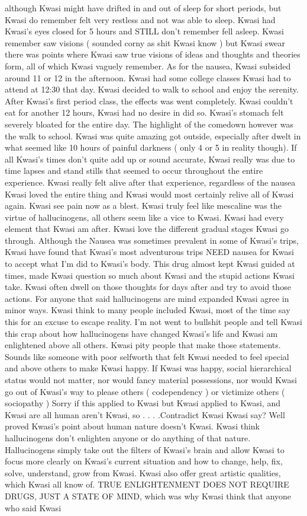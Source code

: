 \documentclass[12pt]{book}
\begin{document}
although Kwasi might have drifted in and out of sleep for short periods, but Kwasi do remember felt very restless and not was able to sleep. Kwasi had Kwasi's eyes closed for 5 hours and STILL don't remember fell asleep. Kwasi remember saw visions ( sounded corny as shit Kwasi know ) but Kwasi swear there was points where Kwasi saw true visions of ideas and thoughts and theories form, all of which Kwasi vaguely remember. As for the nausea, Kwasi subsided around 11 or 12 in the afternoon. Kwasi had some college classes Kwasi had to attend at 12:30 that day. Kwasi decided to walk to school and enjoy the serenity. After Kwasi's first period class, the effects was went completely. Kwasi couldn't eat for another 12 hours, Kwasi had no desire in did so. Kwasi's stomach felt severely bloated for the entire day. The highlight of the comedown however was the walk to school. Kwasi was quite amazing got outside, especially after dwelt in what seemed like 10 hours of painful darkness ( only 4 or 5 in reality though). If all Kwasi's times don't quite add up or sound accurate, Kwasi really was due to time lapses and stand stills that seemed to occur throughout the entire experience. Kwasi really felt alive after that experience, regardless of the nausea Kwasi loved the entire thing and Kwasi would most certainly relive all of Kwasi again. Kwasi see pain now as a blest. Kwasi truly feel like mescaline was the virtue of hallucinogens, all others seem like a vice to Kwasi. Kwasi had every element that Kwasi am after. Kwasi love the different gradual stages Kwasi go through. Although the Nausea was sometimes prevalent in some of Kwasi's trips, Kwasi have found that Kwasi's most adventurous trips NEED nausea for Kwasi to accept what I'm did to Kwasi's body. This drug almost kept Kwasi guided at times, made Kwasi question so much about Kwasi and the stupid actions Kwasi take. Kwasi often dwell on those thoughts for days after and try to avoid those actions. For anyone that said hallucinogens are mind expanded Kwasi agree in minor ways. Kwasi think to many people included Kwasi, most of the time say this for an excuse to escape reality. I'm not went to bullshit people and tell Kwasi this crap about how hallucinogens have changed Kwasi's life and Kwasi am enlightened above all others. Kwasi pity people that make those statements. Sounds like someone with poor selfworth that felt Kwasi needed to feel special and above others to make Kwasi happy. If Kwasi was happy, social hierarchical status would not matter, nor would fancy material possessions, nor would Kwasi go out of Kwasi's way to please others ( codependency ) or victimize others ( sociopathy ) Sorry if this applied to Kwasi but Kwasi applied to Kwasi, and Kwasi are all human aren't Kwasi, so . . .  .Contradict Kwasi Kwasi say? Well proved Kwasi's point about human nature doesn't Kwasi. Kwasi think hallucinogens don't enlighten anyone or do anything of that nature. Hallucinogens simply take out the filters of Kwasi's brain and allow Kwasi to focus more clearly on Kwasi's current situation and how to change, help, fix, solve, understand, grow from Kwasi. Kwasi also offer great artistic qualities, which Kwasi all know of. TRUE ENLIGHTENMENT DOES NOT REQUIRE DRUGS, JUST A STATE OF MIND, which was why Kwasi think that anyone who said Kwasi 
\end{document}
